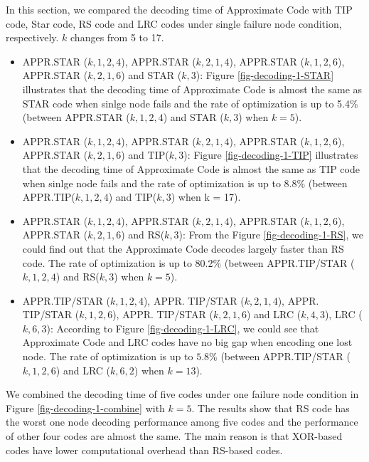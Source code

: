 \documentclass[sigconf]{acmart}
\begin{document}
In this section, we compared the decoding time of Approximate Code with TIP code, Star code, RS code and LRC codes under single failure node condition, respectively. $k$ changes from 5 to 17.
\begin{itemize}
    \item APPR.STAR ($k,1,2,4$), APPR.STAR ($k,2,1,4$), APPR.STAR ($k,1,2,6$), APPR.STAR ($k,2,1,6$) and STAR ($k,3$): Figure \ref{fig-decoding-1-STAR} illustrates that the decoding time of Approximate Code is almost the same as STAR code when sinlge node fails and the rate of optimization is up to 5.4\% (between APPR.STAR ($k,1,2,4$) and STAR ($k,3$) when $k = 5$).
    \item APPR.STAR ($k,1,2,4$), APPR.STAR ($k,2,1,4$), APPR.STAR ($k,1,2,6$), APPR.STAR ($k,2,1,6$) and TIP($k,3$): Figure \ref{fig-decoding-1-TIP} illustrates that the decoding time of Approximate Code is almost the same as TIP code when sinlge node fails and the rate of optimization is up to 8.8\% (between APPR.TIP($k,1,2,4$) and TIP($k,3$) when k = 17).
    \item APPR.STAR ($k,1,2,4$), APPR.STAR ($k,2,1,4$), APPR.STAR ($k,1,2,6$), APPR.STAR ($k,2,1,6$) and RS($k,3$): From the Figure \ref{fig-decoding-1-RS}, we could find out that the Approximate Code decodes largely faster than RS code. The rate of optimization is up to 80.2\% (between APPR.TIP/STAR ($k,1,2,4$) and RS($k,3$) when $k = 5$).
    \item APPR.TIP/STAR ($k,1,2,4$), APPR. TIP/STAR ($k,2,1,4$), APPR. TIP/STAR ($k,1,2,6$), APPR. TIP/STAR ($k,2,1,6$) and LRC ($k,4,3$), LRC  ($k,6,3$):  According to Figure \ref{fig-decoding-1-LRC}, we could see that Approximate Code and LRC codes have no big gap when encoding one lost node. The rate of optimization is up to $5.8\%$ (between APPR.TIP/STAR ($k,1,2,6$) and LRC ($k, 6, 2$) when $k = 13$).
\end{itemize}

We combined the decoding time of five codes under one failure node condition in Figure \ref{fig-decoding-1-combine} with $k=5$. The results show that RS code has the worst one node decoding performance among five codes and the performance of other four codes are almost the same. The main reason is that XOR-based codes have lower computational overhead than RS-based codes.\par
\end{document}
